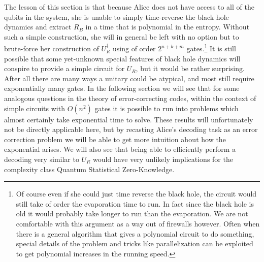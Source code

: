 \documentclass[12pt]{article}
\begin{document}
The lesson of this section is that because Alice does not have access to all of the qubits in the system, she is unable to simply time-reverse the black hole dynamics and extract $R_B$ in a time that is polynomial in the entropy.  Without such a simple construction, she will in general be left with no option but to brute-force her construction of $U_R^\dagger$ using of order $2^{n+k+m}$ gates.\footnote{Of course even if she could just time reverse the black hole, the circuit would still take of order the evaporation time to run.  In fact since the black hole is old it would probably take longer to run than the evaporation.  We are not comfortable with this argument as a way out of firewalls however.  Often when there is a general algorithm that gives a polynomial circuit to do something, special details of the problem and tricks like parallelization can be exploited to get polynomial increases in the running speed.}  It is still possible that some yet-unknown special features of black hole dynamics will conspire to provide a simple circuit for $U_R$, but it would be rather surprising.  After all there are many ways a unitary could be atypical, and most still require exponentially many gates.  In the following section we will see that for some analogous questions in the theory of error-correcting codes, within the context of simple circuits with $O(n^2)$ gates it is possible to run into problems which almost certainly take exponential time to solve.  These results will unfortunately not be directly applicable here, but by recasting Alice's decoding task as an error correction problem we will be able to get more intuition about how the exponential arises.  We will also see that being able to efficiently perform a decoding very similar to $U_R$ would have very unlikely implications for the complexity class {Quantum Statistical Zero-Knowledge}.
\end{document}

